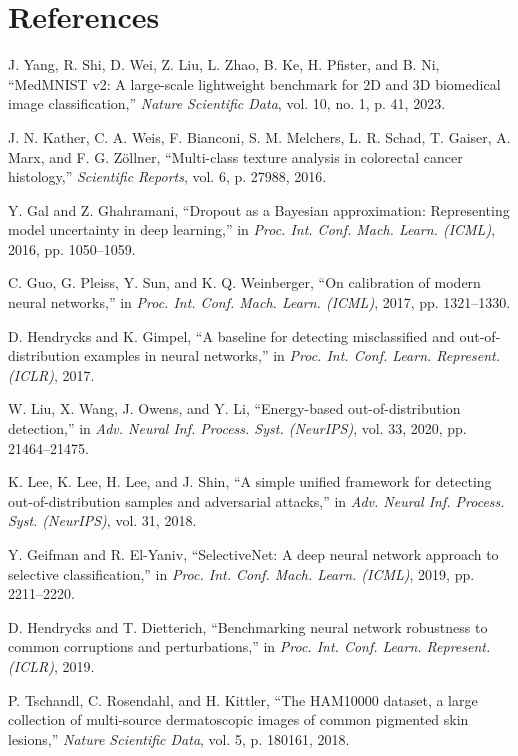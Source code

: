 \documentclass[11pt,a4paper]{article}
\begin{document}
\section{References}
\begin{enumerate}[leftmargin=*,label={[\arabic*]},itemsep=1pt,topsep=2pt]
    \item J. Yang, R. Shi, D. Wei, Z. Liu, L. Zhao, B. Ke, H. Pfister, and B. Ni, ``MedMNIST v2: A large-scale lightweight benchmark for 2D and 3D biomedical image classification,'' \textit{Nature Scientific Data}, vol. 10, no. 1, p. 41, 2023.
    \item J. N. Kather, C. A. Weis, F. Bianconi, S. M. Melchers, L. R. Schad, T. Gaiser, A. Marx, and F. G. Z{\"o}llner, ``Multi-class texture analysis in colorectal cancer histology,'' \textit{Scientific Reports}, vol. 6, p. 27988, 2016.
    \item Y. Gal and Z. Ghahramani, ``Dropout as a Bayesian approximation: Representing model uncertainty in deep learning,'' in \textit{Proc. Int. Conf. Mach. Learn. (ICML)}, 2016, pp. 1050--1059.
    \item C. Guo, G. Pleiss, Y. Sun, and K. Q. Weinberger, ``On calibration of modern neural networks,'' in \textit{Proc. Int. Conf. Mach. Learn. (ICML)}, 2017, pp. 1321--1330.
    \item D. Hendrycks and K. Gimpel, ``A baseline for detecting misclassified and out-of-distribution examples in neural networks,'' in \textit{Proc. Int. Conf. Learn. Represent. (ICLR)}, 2017.
    \item W. Liu, X. Wang, J. Owens, and Y. Li, ``Energy-based out-of-distribution detection,'' in \textit{Adv. Neural Inf. Process. Syst. (NeurIPS)}, vol. 33, 2020, pp. 21464--21475.
    \item K. Lee, K. Lee, H. Lee, and J. Shin, ``A simple unified framework for detecting out-of-distribution samples and adversarial attacks,'' in \textit{Adv. Neural Inf. Process. Syst. (NeurIPS)}, vol. 31, 2018.
    \item Y. Geifman and R. El-Yaniv, ``SelectiveNet: A deep neural network approach to selective classification,'' in \textit{Proc. Int. Conf. Mach. Learn. (ICML)}, 2019, pp. 2211--2220.
    \item D. Hendrycks and T. Dietterich, ``Benchmarking neural network robustness to common corruptions and perturbations,'' in \textit{Proc. Int. Conf. Learn. Represent. (ICLR)}, 2019.
    \item P. Tschandl, C. Rosendahl, and H. Kittler, ``The HAM10000 dataset, a large collection of multi-source dermatoscopic images of common pigmented skin lesions,'' \textit{Nature Scientific Data}, vol. 5, p. 180161, 2018.
\end{enumerate}
\end{document}
